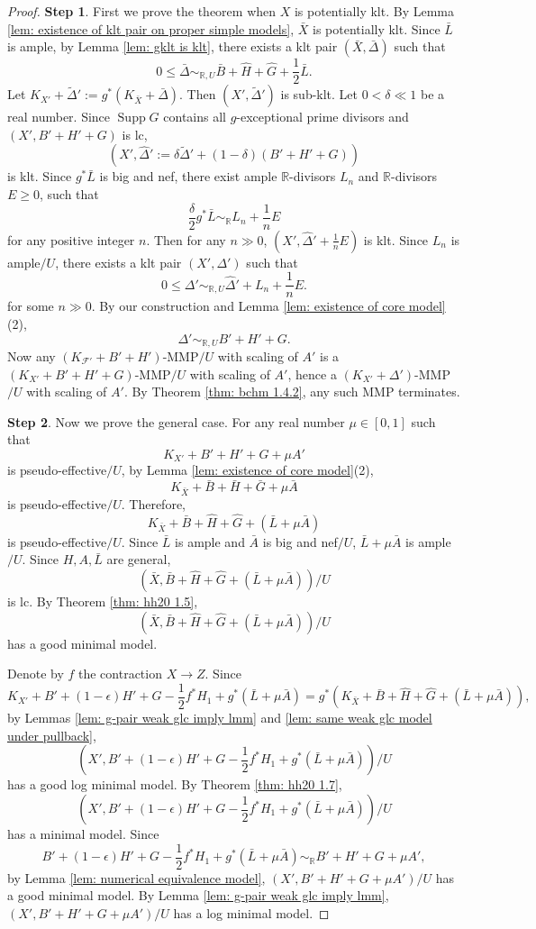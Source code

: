 \documentclass[11pt]{amsart}
\numberwithin{equation}{section}
\newcommand{\Rr}{\mathbb{R}}
\newcommand{\Supp}{\operatorname{Supp}}
\newcommand{\Ff}{\mathcal{F}}
\theoremstyle{definition}
\theoremstyle{definition}
\theoremstyle{definition}
\begin{document}
\begin{proof}
\noindent\textbf{Step 1}. First we prove the theorem when $X$ is potentially klt. By Lemma \ref{lem: existence of klt pair on proper simple models}, $\bar X$ is potentially klt. Since $\bar L$ is ample, by Lemma \ref{lem: gklt is klt}, there exists a klt pair $(\bar X,\bar\Delta)$ such that
$$0\leq\bar\Delta\sim_{\mathbb R,U}\bar B+\widehat H+\widehat G+\frac{1}{2}\bar L.$$
Let $K_{X'}+\tilde\Delta':=g^*(K_{\bar X}+\bar\Delta)$. Then $(X',\tilde\Delta')$ is sub-klt. Let $0<\delta\ll 1$ be a real number. Since $\Supp G$ contains all $g$-exceptional prime divisors and $(X',B'+H'+G)$ is lc,
$$(X',\widehat\Delta':=\delta\tilde\Delta'+(1-\delta)(B'+H'+G))$$
is klt. Since $g^*\bar L$ is big and nef, there exist ample $\Rr$-divisors $L_n$ and $\Rr$-divisors $E\geq 0$, such that
$$\frac{\delta}{2}g^*\bar L\sim_{\mathbb R}L_n+\frac{1}{n}E$$
for any positive integer $n$. Then for any $n\gg 0$, $(X',\widehat\Delta'+\frac{1}{n}E)$ is klt. Since $L_n$ is ample$/U$, there exists a klt pair $(X',\Delta')$ such that
$$0\leq\Delta'\sim_{\mathbb R,U}\widehat\Delta'+L_n+\frac{1}{n}E.$$
for some $n\gg 0$. By our construction and Lemma \ref{lem: existence of core model}(2),
$$\Delta'\sim_{\mathbb R,U}B'+H'+G.$$
Now any $(K_{\Ff'}+B'+H')$-MMP$/U$ with scaling of $A'$ is a $(K_{X'}+B'+H'+G)$-MMP$/U$ with scaling of $A'$, hence a $(K_{X'}+\Delta')$-MMP$/U$ with scaling of $A'$. By Theorem \ref{thm: bchm 1.4.2}, any such MMP terminates.

\medskip

\noindent\textbf{Step 2}. Now we prove the general case. For any real number $\mu\in [0,1]$ such that $$K_{X'}+B'+H'+G+\mu A'$$ is pseudo-effective$/U$, by Lemma \ref{lem: existence of core model}(2), $$K_{\bar X}+\bar B+\bar H+\bar G+\mu\bar A$$ 
is pseudo-effective$/U$. Therefore, 
$$K_{\bar X}+\bar B+\widehat H+\widehat G+(\bar L+\mu\bar A)$$ 
is pseudo-effective$/U$. Since $\bar L$ is ample and $\bar A$ is big and nef$/U$, $\bar L+\mu\bar A$ is ample$/U$. Since $H,A,\bar L$ are general,
$$(\bar X,\bar B+\widehat H+\widehat G+(\bar L+\mu\bar A))/U$$
is lc. By Theorem \ref{thm: hh20 1.5},
$$(\bar X,\bar B+\widehat H+\widehat G+(\bar L+\mu\bar A))/U$$
has a good minimal model.

Denote by $f$ the contraction $X\rightarrow Z$. Since
$$K_{X'}+B'+(1-\epsilon)H'+G-\frac{1}{2}f^*H_1+g^*(\bar L+\mu\bar A)=g^*(K_{\bar X}+\bar B+\widehat H+\widehat G+(\bar L+\mu\bar A)),$$
by Lemmas \ref{lem: g-pair weak glc imply lmm} and \ref{lem: same weak glc model under pullback}, 
$$\left(X',B'+(1-\epsilon)H'+G-\frac{1}{2}f^*H_1+g^*(\bar L+\mu\bar A)\right)\Bigg/U$$
has a good log minimal model. By Theorem \ref{thm: hh20 1.7}, 
$$\left(X',B'+(1-\epsilon)H'+G-\frac{1}{2}f^*H_1+g^*(\bar L+\mu\bar A)\right)\Bigg/U$$
has a minimal model. Since
$$B'+(1-\epsilon)H'+G-\frac{1}{2}f^*H_1+g^*(\bar L+\mu\bar A)\sim_{\mathbb R}B'+H'+G+\mu A',$$
by Lemma \ref{lem: numerical equivalence model}, $(X',B'+H'+G+\mu A')/U$ has a good minimal model. By Lemma \ref{lem: g-pair weak glc imply lmm}, $(X',B'+H'+G+\mu A')/U$ has a log minimal model.


\end{proof}
\end{document}
